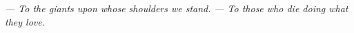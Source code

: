 %
%

\pubmode
	\onecolumngrid
\fi

\vspace*{180pt}
\begin{center}
\pubmode
	\textit{--- To the giants upon whose shoulders we stand.}
\else
	\textit{--- To those who die doing what they love.}
\fi
\end{center}
\newpage

\pubmode
	\twocolumngrid
\fi
